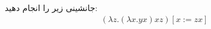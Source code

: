 جانشینی زیر را انجام دهید:
\begin{gather*}
    (\lambda z. (\lambda x . yx) xz) [x:=zx]
\end{gather*}